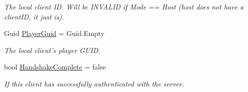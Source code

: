 \begin{DoxyCompactItemize}
\begin{DoxyCompactList}\small\item\em The local client I\-D. Will be I\-N\-V\-A\-L\-I\-D if Mode == Host (host does not have a client\-I\-D, it just is). \end{DoxyCompactList}\item 
Guid \hyperlink{class_skyrates_1_1_common_1_1_network_1_1_session_a2c3090338ac56475b1a536db879e8ddf}{Player\-Guid} = Guid.\-Empty
\begin{DoxyCompactList}\small\item\em The local client's player G\-U\-I\-D. \end{DoxyCompactList}\item 
bool \hyperlink{class_skyrates_1_1_common_1_1_network_1_1_session_aa819705fe7a825f718a25cf932471a47}{Handshake\-Complete} = false
\begin{DoxyCompactList}\small\item\em If this client has successfully authenticated with the server. \end{DoxyCompactList}\end{DoxyCompactItemize}
